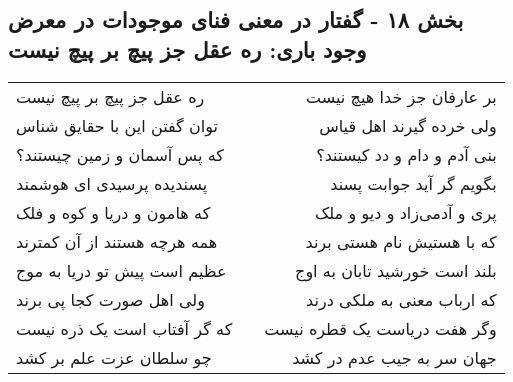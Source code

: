 \begin{center}
\section*{بخش ۱۸ - گفتار در معنی فنای موجودات در معرض وجود باری: ره عقل جز پیچ بر پیچ نیست}
\label{sec:018}
\begin{longtable}{l p{0.5cm} r}
ره عقل جز پیچ بر پیچ نیست
&&
بر عارفان جز خدا هیچ نیست
\\
توان گفتن این با حقایق شناس
&&
ولی خرده گیرند اهل قیاس
\\
که پس آسمان و زمین چیستند؟
&&
بنی آدم و دام و دد کیستند؟
\\
پسندیده پرسیدی ای هوشمند
&&
بگویم گر آید جوابت پسند
\\
که هامون و دریا و کوه و فلک
&&
پری و آدمی‌زاد و دیو و ملک
\\
همه هرچه هستند از آن کمترند
&&
که با هستیش نام هستی برند
\\
عظیم است پیش تو دریا به موج
&&
بلند است خورشید تابان به اوج
\\
ولی اهل صورت کجا پی برند
&&
که ارباب معنی به ملکی درند
\\
که گر آفتاب است یک ذره نیست
&&
وگر هفت دریاست یک قطره نیست
\\
چو سلطان عزت علم بر کشد
&&
جهان سر به جیب عدم در کشد
\\
\end{longtable}
\end{center}
